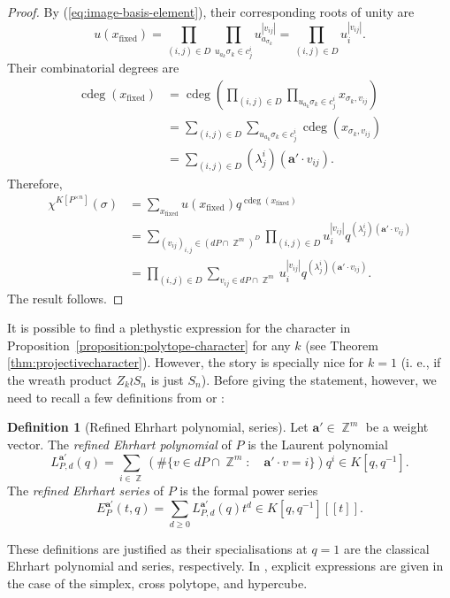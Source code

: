 \documentclass[a4paper,12pt]{amsart}
\theoremstyle{plain}
\theoremstyle{definition}
\newtheorem{definition}[theorem]{Definition}
\theoremstyle{remark}
\DeclareMathOperator{\ZZ}{\mathbb{Z}}
\DeclareMathOperator{\cdeg}{cdeg}
\DeclareMathOperator{\fixed}{fixed}
\begin{document}
\begin{proof}
    By (\ref{eq:image-basis-element}), their corresponding roots of unity are
    \[
    u(x_{\fixed}) = \prod_{(i, j) \in D}\prod_{u_{a_k}\sigma_k \in c_j^i} u_{a_{\sigma_k}}^{|v_{ij}|} = \prod_{(i, j) \in D} u_i^{|v_{ij}|}.
    \]
    Their combinatorial degrees are
    \begin{align*}
        \cdeg(x_{\fixed}) 
        &= \cdeg \left ( \prod_{(i, j) \in D}\prod_{u_{a_k}\sigma_k \in c_j^i} x_{\sigma_{k}, v_{ij}} \right ) \\
        &= \sum_{(i, j) \in D} \sum_{u_{a_k}\sigma_k \in c_j^i} \cdeg(x_{\sigma_{k}, v_{ij}}) \\
        &= \sum_{(i, j) \in D} (\lambda_j^i) (\bm{a}' \cdot v_{ij}).
    \end{align*}
    Therefore,
    \begin{align*}
        [t^d]\chi^{K[P^{\times n}]}(\sigma) 
        &= \sum_{x_{\fixed}} u(x_{\fixed})q^{\cdeg(x_{\fixed})} \\
        &= \sum_{(v_{ij})_{i, j} \in (dP \cap \ZZ^m)^D} \prod_{(i, j) \in D} u_i^{|v_{ij}|}q^{(\lambda_j^i) (\bm{a}' \cdot v_{ij})} \\
        &= \prod_{(i, j) \in D} \sum_{v_{ij} \in dP \cap \ZZ^m} u_i^{|v_{ij}|}q^{(\lambda_j^i) (\bm{a}' \cdot v_{ij})}.
    \end{align*}
    The result follows.
\end{proof}

It is possible to find a plethystic expression for the character in Proposition~\ref{proposition:polytope-character} for any $k$ (see Theorem \ref{thm:projectivecharacter}). However, the story is specially nice for $k = 1$ (i. e., if the wreath product $Z_k \wr S_n$ is just $S_n$). Before giving the statement, however, we need to recall a few definitions from \cite{chapoton-analogues} or \cite{adeyemo-szendroi-refined}:

\begin{definition}[Refined Ehrhart polynomial, series]
    Let $\bm{a}' \in \ZZ^m$ be a weight vector. The \emph{refined Ehrhart polynomial} of $P$ is the Laurent polynomial
    \[
    L_{P, d}^{\bm{a}'}(q) = \sum_{i \in \ZZ} (\# \{v \in dP \cap \ZZ^m: \quad \bm{a}' \cdot v = i\}) q^i \in K[q, q^{-1}].
    \]
    The \emph{refined Ehrhart series} of $P$ is the formal power series
    \[
    E_P^{\bm{a}'}(t, q) = \sum_{d \geq 0} L_{P, d}^{\bm{a}'}(q)t^d \in K[q, q^{-1}][\![ t ]\!].
    \]
\end{definition}

These definitions are justified as their specialisations at $q = 1$ are the classical Ehrhart polynomial and series, respectively. In \cite{adeyemo-szendroi-refined}, explicit expressions are given in the case of the simplex, cross polytope, and hypercube. 
\end{document}
